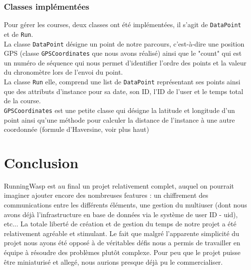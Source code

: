 \documentclass[a4paper,11pt]{article}
\begin{document}
\subsubsection{Classes implémentées}
Pour gérer les courses, deux classes ont été implémentées, il s'agit de \verb+DataPoint+ et de \verb+Run+. \\

La classe \verb+DataPoint+ désigne un point de notre parcours, c'est-à-dire une position GPS (classe \verb+GPSCoordinates+ que nous avons réalisé) ainsi que le "count" qui est un numéro de séquence qui nous permet d'identifier l'ordre des points et la valeur du chronomètre lors de l'envoi du point. \\

La classe \verb+Run+ elle, comprend une list de \verb+DataPoint+ représentant ses points ainsi que des attributs d'instance pour sa date, son ID, l'ID de l'user et le temps total de la course. \\

\verb+GPSCoordinates+ est une petite classe qui désigne la latitude et longitude d'un point ainsi qu'une méthode pour calculer la distance de l'instance à une autre coordonnée (formule d'Haversine, voir plus haut)


\section{Conclusion}
RunningWasp est au final un projet relativement complet, auquel on pourrait imaginer ajouter encore des nombreuses features : un chiffrement des communications entre les différents éléments, une gestion du multiuser (dont nous avons déjà l'infrastructure en base de données via le système de user ID - uid), etc... 
\newline La totale liberté de création et de gestion du temps de notre projet a été relativement agréable et stimulant. Le fait que malgré l'apparente simplicité du projet nous ayons été opposé à de véritables défis nous a permis de travailler en équipe à résoudre des problèmes plutôt complexe. 
\newline Pour peu que le projet puisse être miniaturisé et allegé, nous aurions presque déjà pu le commercialiser.
\end{document}
